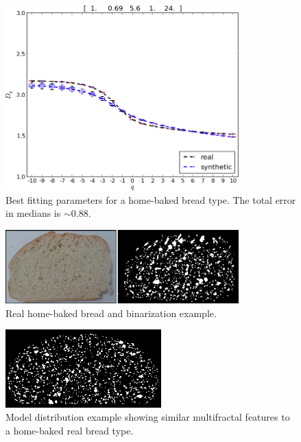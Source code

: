 \documentclass[spanish,a4paper,11pt,oneside,links]{report}
\begin{document}
\begin{figure}[!ht]
\includegraphics[width=9cm]{figures/bestboxplot2}
\caption{Best fitting parameters for a home-baked bread type. The total error in medians is $\sim 0.88$.}
\label{bestboxplot2}
\end{figure}

\begin{figure}[!ht]
\begin{center}
\includegraphics[width=9cm]{figures/realbin2}
\caption{ Real home-baked bread and binarization example.}
\label{realbin2}
\end{center}
\end{figure}

\begin{figure}[!ht]
\begin{center}
\includegraphics[width=6cm]{figures/best2}
\caption{Model distribution example showing similar multifractal features to a home-baked real bread type.}
\label{best2}
\end{center}
\end{figure}


\end{document}
